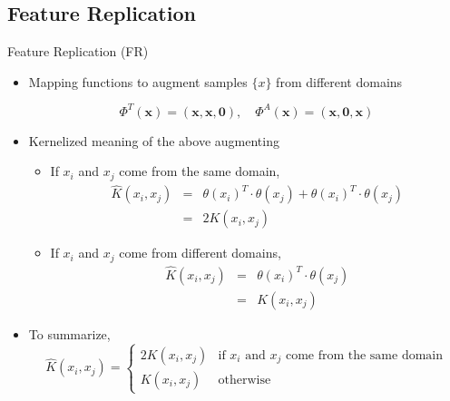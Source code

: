 \subsection{Feature Replication}
\begin{frame}{Feature Replication (FR)}
	\begin{itemize}
		\item Mapping functions to augment samples $\{x\}$ from different domains

\begin{equation}\Phi^T(\mathbf{x}) = (\mathbf{x},\mathbf{x},\mathbf{0}), \quad  \Phi^A(\mathbf{x}) = (\mathbf{x},\mathbf{0}, \mathbf{x})\end{equation}

		\item \alert{Kernelized} meaning of the above augmenting\\

			\begin{itemize}
			\item If $x_i$ and $x_j$ come from the same domain, 
\begin{eqnarray}
\hat K(x_i, x_j) &  = & \theta(x_i)^T \cdot \theta(x_j) + \theta(x_i)^T \cdot \theta(x_j) \nonumber \\
 & = & 2 K(x_i, x_j)
\end{eqnarray}

			\item If  $x_i$ and $x_j$ come from different domains,
\begin{eqnarray}
\hat K(x_i, x_j)  & = &  \theta(x_i)^T \cdot \theta(x_j)  \nonumber \\
 & = &  K(x_i, x_j) 
\end{eqnarray}
			\end{itemize}

		\item To summarize,
\[
 \hat K(x_i, x_j) =
  \begin{cases}
   2 K(x_i, x_j) & \text{if } x_i \text{ and } x_j \text{ come from the same domain}\\
   K(x_i, x_j)   & \text{otherwise} 
  \end{cases}
\]		
	\end{itemize}
\end{frame}

